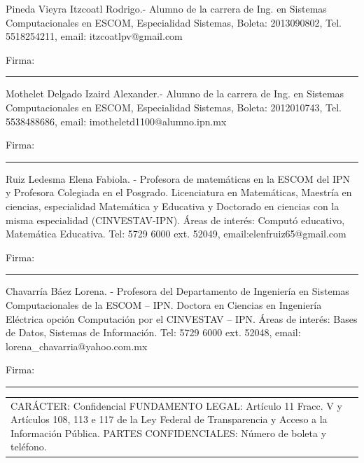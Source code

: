 \documentclass{article}
\newcommand\signature{
\noindent\begin{minipage}{10cm}
    \noindent\vspace{3pt}\par
    Firma: \rule{7cm}{1pt}
    \noindent\vspace{15pt}\par
\end{minipage}}
\begin{document}
\begin{minipage}{.45\textwidth}
Pineda Vieyra Itzcoatl Rodrigo.- Alumno de la carrera de Ing. 
en Sistemas Computacionales en ESCOM, Especialidad Sistemas, 
Boleta: 2013090802, Tel. 5518254211, email: itzcoatlpv@gmail.com
\signature


Mothelet Delgado Izaird Alexander.- Alumno de la carrera de Ing. 
en Sistemas Computacionales en ESCOM, Especialidad Sistemas, 
Boleta: 2012010743, Tel. 5538488686, email: imotheletd1100@alumno.ipn.mx
\signature

Ruiz Ledesma Elena Fabiola. - Profesora de matemáticas en la 
ESCOM del IPN y Profesora Colegiada en el Posgrado. Licenciatura 
en Matemáticas, Maestría en ciencias, especialidad Matemática y 
Educativa y Doctorado en ciencias con la misma especialidad (CINVESTAV-IPN). 
Áreas de interés: Computó educativo, Matemática Educativa. Tel: 5729 6000 ext. 
52049, email:elenfruiz65@gmail.com
\signature

Chavarría Báez Lorena. - Profesora del Departamento de Ingeniería en 
Sistemas Computacionales de la ESCOM – IPN. Doctora en Ciencias en 
Ingeniería Eléctrica opción Computación por el CINVESTAV – IPN. Áreas de 
interés: Bases de Datos, Sistemas de Información. Tel: 5729 6000 ext. 52048, 
email: lorena\_chavarria@yahoo.com.mx
\signature
	
\end{minipage}%
\hfill
\begin{minipage}{.4\textwidth}
\begin{tabular}{p{\textwidth}}
CARÁCTER: Confidencial FUNDAMENTO LEGAL: Artículo 11 Fracc. V y Artículos 108, 113 
e 117 de la Ley Federal de Transparencia y Acceso a la Información Pública. PARTES 
CONFIDENCIALES: Número de boleta y teléfono.
\end{tabular}
\end{minipage}
	

\printbibliography
\end{document}
